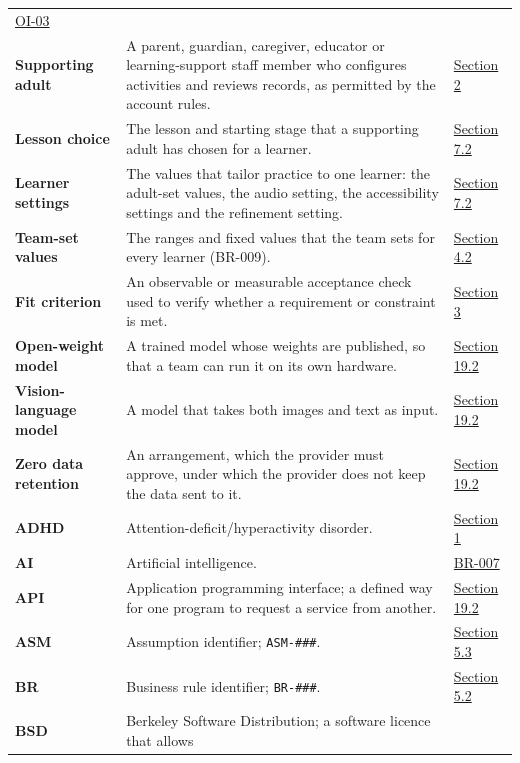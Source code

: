\documentclass[12pt]{article}
\renewcommand{\_}{\textunderscore\allowbreak}%
\begin{document}
{\begin{longtable}{@{}>{\raggedright\arraybackslash}p{}>{\raggedright\arraybackslash}p{}>{\raggedright\arraybackslash}p{}@{}}
\hyperref[sec:open-issues]{OI-03}\\
\textbf{Supporting adult} & A parent, guardian, caregiver, educator or
learning-support staff member who configures activities and reviews records, as
permitted by the account rules. & \hyperref[sec:stakeholders]{Section 2}\\
\textbf{Lesson choice} & The lesson and starting stage that a supporting adult
has chosen for a learner. & \hyperref[sec:data-dictionary]{Section 7.2}\\
\textbf{Learner settings} & The values that tailor practice to one learner: the
adult-set values, the audio setting, the accessibility settings and the
refinement setting. & \hyperref[sec:data-dictionary]{Section 7.2}\\
\textbf{Team-set values} & The ranges and fixed values that the team sets for
every learner (BR-009). & \hyperref[sec:constants]{Section 4.2}\\
\textbf{Fit criterion} & An observable or measurable acceptance check used to
verify whether a requirement or constraint is met. &
\hyperref[sec:constraints]{Section 3}\\
\textbf{Open-weight model} & A trained model whose weights are published, so
that a team can run it on its own hardware. &
\hyperref[sec:ots-components]{Section 19.2}\\
\textbf{Vision-language model} & A model that takes both images and text as
input. & \hyperref[sec:ots-components]{Section 19.2}\\
\textbf{Zero data retention} & An arrangement, which the provider must approve,
under which the provider does not keep the data sent to it. &
\hyperref[sec:ots-components]{Section 19.2}\\
\textbf{ADHD} & Attention-deficit/hyperactivity disorder. &
\hyperref[sec:purpose]{Section 1}\\
\textbf{AI} & Artificial intelligence. & \hyperref[sec:business-rules]{BR-007}\\
\textbf{API} & Application programming interface; a defined way for one program
to request a service from another. & \hyperref[sec:ots-components]{Section
19.2}\\
\textbf{ASM} & Assumption identifier; \texttt{ASM-\#\#\#}. &
\hyperref[sec:assumptions]{Section 5.3}\\
\textbf{BR} & Business rule identifier; \texttt{BR-\#\#\#}. &
\hyperref[sec:business-rules]{Section 5.2}\\
\textbf{BSD} & Berkeley Software Distribution; a software licence that allows

\end{longtable}}
\end{document}
